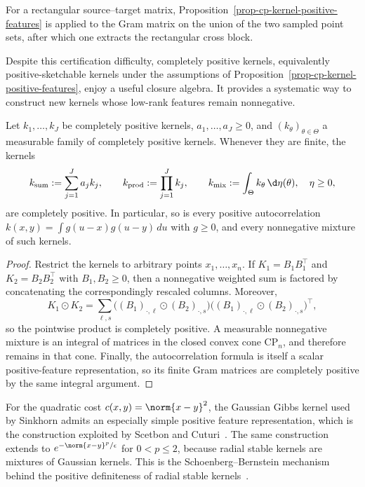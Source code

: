
For a rectangular source--target matrix, Proposition~\ref{prop-cp-kernel-positive-features} is applied to the Gram matrix on the union of the two sampled point sets, after which one extracts the rectangular cross block.

Despite this certification difficulty, completely positive kernels, equivalently positive-sketchable kernels under the assumptions of Proposition~\ref{prop-cp-kernel-positive-features}, enjoy a useful closure algebra. It provides a systematic way to construct new kernels whose low-rank features remain nonnegative.
\begin{prop}
\label{prop-completely-positive-kernel-closure}
Let \(k_1,\ldots,k_J\) be completely positive kernels, \(a_1,\ldots,a_J\geq0\), and \((k_\theta)_{\theta\in\Theta}\) a measurable family of completely positive kernels. Whenever they are finite, the kernels
\[
	k_{\mathrm{sum}}:=\sum_{j=1}^J a_jk_j,
	\qquad
	k_{\mathrm{prod}}:=\prod_{j=1}^J k_j,
	\qquad
	k_{\mathrm{mix}}:=\int_\Theta k_\theta\,\d\eta(\theta),
	\quad \eta\geq0,
\]
are completely positive. In particular, so is every positive autocorrelation
$k(x,y)=\int g(u-x)g(u-y)\,du$ with $g\geq0$,
and every nonnegative mixture of such kernels.
\end{prop}

\begin{proof}
Restrict the kernels to arbitrary points \(x_1,\ldots,x_n\). If \(K_1=B_1B_1^\top\) and \(K_2=B_2B_2^\top\) with \(B_1,B_2\geq0\), then a nonnegative weighted sum is factored by concatenating the correspondingly rescaled columns. Moreover,
\[
	K_1\odot K_2
	=
	\sum_{\ell,s}
	\big((B_1)_{\cdot,\ell}\odot(B_2)_{\cdot,s}\big)
	\big((B_1)_{\cdot,\ell}\odot(B_2)_{\cdot,s}\big)^\top,
\]
so the pointwise product is completely positive. A measurable nonnegative mixture is an integral of matrices in the closed convex cone \(\mathrm{CP}_n\), and therefore remains in that cone. Finally, the autocorrelation formula is itself a scalar positive-feature representation, so its finite Gram matrices are completely positive by the same integral argument.
\end{proof}

For the quadratic cost \(c(x,y)=\norm{x-y}^2\), the Gaussian Gibbs kernel used by Sinkhorn admits an especially simple positive feature representation, which is the construction exploited by Scetbon and Cuturi~\cite{ScetbonCuturi2020PositiveFeatures}. The same construction extends to \(e^{-\norm{x-y}^p/\epsilon}\) for \(0<p\leq2\), because radial stable kernels are mixtures of Gaussian kernels. This is the Schoenberg--Bernstein mechanism behind the positive definiteness of radial stable kernels~\cite{schoenberg38,berg84harmonic}.

